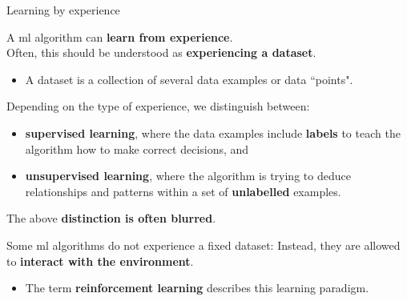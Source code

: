 %
%
%

\begin{frame}[t]{Learning by experience}

    A \gls{ml} algorithm can {\bf learn from experience}.\\
    \vspace{0.2cm}
    Often, this should be understood as {\bf experiencing a dataset}.
    \begin{itemize}
        \item 
        \small
        A dataset is a collection of several data examples or data ``points".\\
    \end{itemize}
    \vspace{0.1cm}
    Depending on the type of experience,
    we distinguish between:\\
    \vspace{0.1cm}
    \begin{itemize}
        \item 
        {\bf {}\gls{supervised learning}}, 
        where the data examples include {\bf labels} to teach the algorithm
        how to make correct decisions,
        and\\
        \vspace{0.1cm}
        \item 
        {\bf {}\gls{unsupervised learning}},
        where the algorithm is trying to deduce relationships and patterns
        within a set of {\bf unlabelled} examples.\\
    \end{itemize}
    \vspace{0.1cm}
    The above {\bf distinction is often blurred}.\\

    \vspace{0.2cm}

    Some \gls{ml} algorithms do not experience a fixed dataset:
    Instead, they are allowed to {\bf interact with the environment}.
    \begin{itemize}
        \item 
        The term
        {\bf {}\gls{reinforcement learning}}
        describes this learning paradigm.\\
    \end{itemize}

\end{frame}

